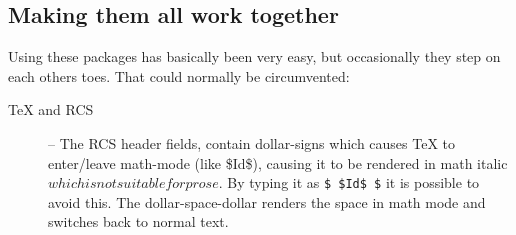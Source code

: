\subsection{Making them all work together}
\label{sec:making-them-all-work-together}

Using these packages has basically been very easy, but occasionally
they step on each others toes.  That could normally be circumvented:

\begin{description}
\item[{\TeX} and RCS] -- The RCS header fields, contain dollar-signs
  which causes {\TeX} to enter/leave math-mode (like
  \mbox{\$I}\mbox{d\$}), causing it to be rendered in math italic
  $which is not suitable for prose$.  By typing it as \texttt{\$
    \${}Id\$ \$} it is possible to avoid this. The dollar-space-dollar
  renders the space in math mode and switches back to normal text.


\end{description}

